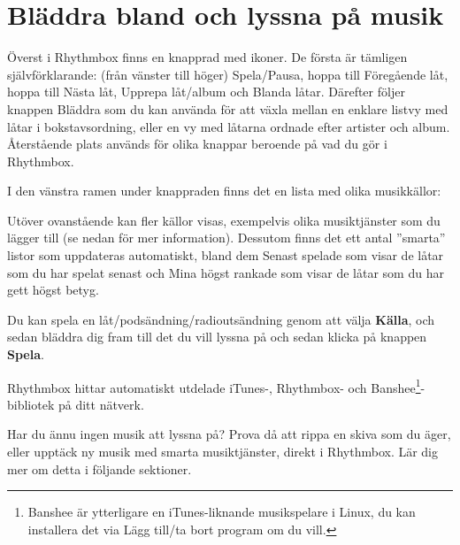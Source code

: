 \documentclass[a4paper,final]{memoir} %
\begin{document}
\section{Bläddra bland och lyssna på musik}


Överst i Rhythmbox finns en knapprad med ikoner. De första är tämligen självförklarande: (från vänster till höger) Spela/Pausa, hoppa till Föregående låt, hoppa till Nästa låt, Upprepa låt/album och Blanda låtar. Därefter följer knappen Bläddra som du kan använda för att växla mellan en enklare listvy med låtar i bokstavsordning, eller en vy med låtarna ordnade efter artister och album. Återstående plats används för olika knappar beroende på vad du gör i Rhythmbox.

I den vänstra ramen under knappraden finns det en lista med olika musikkällor:

\begin{itemize}


\end{itemize}

Utöver ovanstående kan fler källor visas, exempelvis olika musiktjänster som du lägger till (se nedan för mer information). Dessutom finns det ett antal ''smarta'' listor som uppdateras automatiskt, bland dem Senast spelade som visar de låtar som du har spelat senast och Mina högst rankade som visar de låtar som du har gett högst betyg.

Du kan spela en låt/podsändning/radioutsändning genom att välja \textbf{Källa}, och sedan bläddra dig fram till det du vill lyssna på och sedan klicka på knappen \textbf{Spela}.

Rhythmbox hittar automatiskt utdelade iTunes-, Rhythmbox- och Banshee\footnote{Banshee är ytterligare en iTunes-liknande musikspelare i Linux, du kan installera det via Lägg till/ta bort program om du vill.}-bibliotek på ditt nätverk. 

Har du ännu ingen musik att lyssna på? Prova då att rippa en skiva som du äger, eller upptäck ny musik med smarta musiktjänster, direkt i Rhythmbox. Lär dig mer om detta i följande sektioner.
\end{document}
